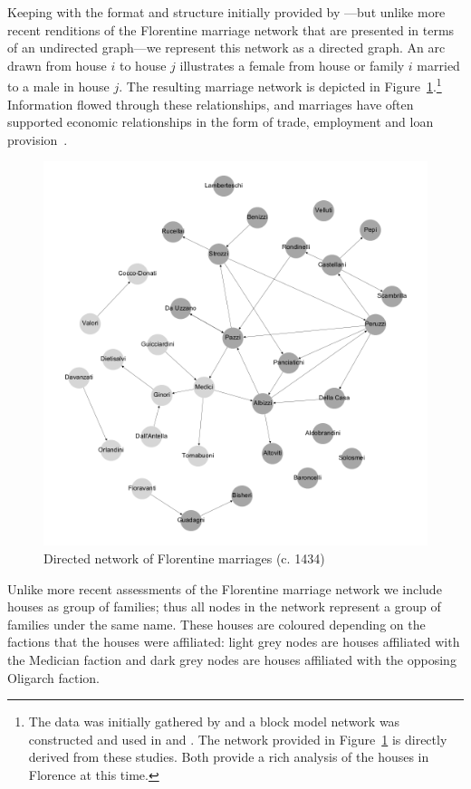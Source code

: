 Keeping with the format and structure initially provided by \citet[p.~1276--77]{Padgett1993}---but unlike more recent renditions of the Florentine marriage network that are presented in terms of an undirected graph---we represent this network as a directed graph. An arc drawn from house $i$ to house $j$ illustrates a female from house or family $i$ married to a male in house $j$. The resulting marriage network is depicted in Figure~\ref{Fig:FlorentineFamilies}.\footnote{The data was initially gathered by \citet{Kent1978} and a block model network was constructed and used in \citet{Padgett1993} and \citet{Padgett1994}. The network provided in Figure~\ref{Fig:FlorentineFamilies} is directly derived from these studies. Both provide a rich analysis of the houses in Florence at this time.} Information flowed through these relationships, and marriages have often supported economic relationships in the form of trade, employment and loan provision~\citep{Kent2009}.

\begin{figure}[h]
\centering
\includegraphics[scale=0.37]{Images/Florentine-marr.png}
\caption{Directed network of Florentine marriages (c. 1434)}
\label{Fig:FlorentineFamilies}
\end{figure}

Unlike more recent assessments of the Florentine marriage network we include houses as group of families; thus all nodes in the network represent a group of families under the same name. These houses are coloured depending on the factions that the houses were affiliated: light grey nodes are houses affiliated with the Medician faction and dark grey nodes are houses affiliated with the opposing Oligarch faction.

